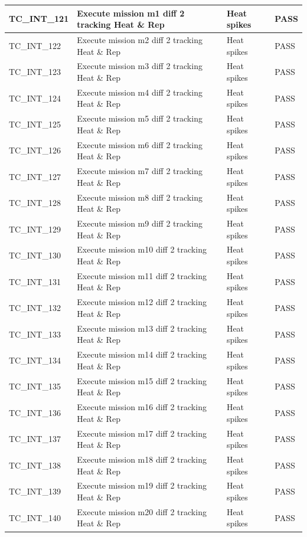 \documentclass{article}
\begin{document}
\begin{longtable}{|p{2cm}|p{8cm}|p{3cm}|p{2cm}|}
\hline
TC\_INT\_121 & Execute mission m1 diff 2 tracking Heat \& Rep & Heat spikes & PASS \\
\hline
TC\_INT\_122 & Execute mission m2 diff 2 tracking Heat \& Rep & Heat spikes & PASS \\
\hline
TC\_INT\_123 & Execute mission m3 diff 2 tracking Heat \& Rep & Heat spikes & PASS \\
\hline
TC\_INT\_124 & Execute mission m4 diff 2 tracking Heat \& Rep & Heat spikes & PASS \\
\hline
TC\_INT\_125 & Execute mission m5 diff 2 tracking Heat \& Rep & Heat spikes & PASS \\
\hline
TC\_INT\_126 & Execute mission m6 diff 2 tracking Heat \& Rep & Heat spikes & PASS \\
\hline
TC\_INT\_127 & Execute mission m7 diff 2 tracking Heat \& Rep & Heat spikes & PASS \\
\hline
TC\_INT\_128 & Execute mission m8 diff 2 tracking Heat \& Rep & Heat spikes & PASS \\
\hline
TC\_INT\_129 & Execute mission m9 diff 2 tracking Heat \& Rep & Heat spikes & PASS \\
\hline
TC\_INT\_130 & Execute mission m10 diff 2 tracking Heat \& Rep & Heat spikes & PASS \\
\hline
TC\_INT\_131 & Execute mission m11 diff 2 tracking Heat \& Rep & Heat spikes & PASS \\
\hline
TC\_INT\_132 & Execute mission m12 diff 2 tracking Heat \& Rep & Heat spikes & PASS \\
\hline
TC\_INT\_133 & Execute mission m13 diff 2 tracking Heat \& Rep & Heat spikes & PASS \\
\hline
TC\_INT\_134 & Execute mission m14 diff 2 tracking Heat \& Rep & Heat spikes & PASS \\
\hline
TC\_INT\_135 & Execute mission m15 diff 2 tracking Heat \& Rep & Heat spikes & PASS \\
\hline
TC\_INT\_136 & Execute mission m16 diff 2 tracking Heat \& Rep & Heat spikes & PASS \\
\hline
TC\_INT\_137 & Execute mission m17 diff 2 tracking Heat \& Rep & Heat spikes & PASS \\
\hline
TC\_INT\_138 & Execute mission m18 diff 2 tracking Heat \& Rep & Heat spikes & PASS \\
\hline
TC\_INT\_139 & Execute mission m19 diff 2 tracking Heat \& Rep & Heat spikes & PASS \\
\hline
TC\_INT\_140 & Execute mission m20 diff 2 tracking Heat \& Rep & Heat spikes & PASS \\

\end{longtable}
\end{document}
